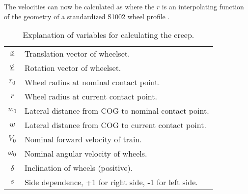 The velocities can now be calculated as
where the $r$ is an interpolating function of the geometry of a standardized S1002 wheel profile \cite{railvehicledynamics_eandersson}.

\begin{table}[htpb!]
 \centering
 \caption{Explanation of variables for calculating the creep.}
 \begin{tabular}{c | l}
  $\underline{x}$       & Translation vector of wheelset.\\
  $\underline{\varphi}$ & Rotation vector of wheelset.\\
  $r_0$		 & Wheel radius at nominal contact point.\\
  $r$            & Wheel radius at current contact point.\\
  $w_0$		 & Lateral distance from COG to nominal contact point.\\
  $w$		 & Lateral distance from COG to current contact point.\\
  $V_0$		 & Nominal forward velocity of train.\\
  $\omega_0$	 & Nominal angular velocity of wheels.\\
  $\delta$	 & Inclination of wheels (positive).\\
  $s$		 & Side dependence, +1 for right side, -1 for left side.
 \end{tabular}
\end{table}

